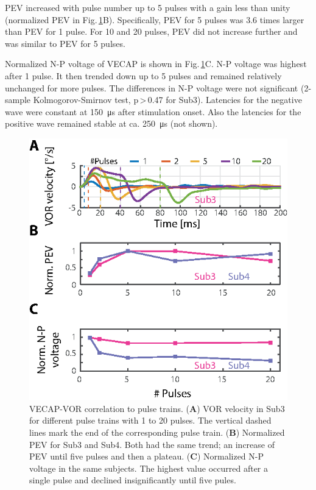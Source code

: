 PEV increased with pulse number up to 5 pulses with a gain less than unity (normalized PEV in Fig.\,\ref{fig:vecapvor:trains}B). Specifically, PEV for 5 pulses was 3.6 times larger than PEV for 1 pulse. For 10 and 20 pulses, PEV did not increase further and was similar to PEV for 5 pulses.  

Normalized N-P voltage of VECAP is shown in Fig.\,\ref{fig:vecapvor:trains}C. N-P voltage was highest after 1 pulse. It then trended down up to 5 pulses and remained relatively unchanged for more pulses. The differences in N-P voltage were not significant (2-sample Kolmogorov-Smirnov test, p\,\textgreater\,0.47 for Sub3).
Latencies for the negative wave were constant at \SI{150}{\micro\second} after stimulation onset. Also the latencies for the positive wave remained stable at ca. \SI{250}{\micro\second} (not shown).
 
\begin{figure}[btp]
\centering
\includegraphics{chapters/partI/vecapvor/figures/Fig_vecapvor_trains2.eps} 
\caption[VECAP-VOR correlation to pulse trains]{VECAP-VOR correlation to pulse trains. (\textbf{A}) VOR velocity in Sub3 for different pulse trains with 1 to 20 pulses. The vertical dashed lines mark the end of the corresponding pulse train. (\textbf{B}) Normalized PEV for Sub3 and Sub4. Both had the same trend; an increase of PEV until five pulses and then a plateau. (\textbf{C}) Normalized N-P voltage in the same subjects. The highest value occurred after a single pulse and declined insignificantly until five pules.
}
\label{fig:vecapvor:trains}
\end{figure}

